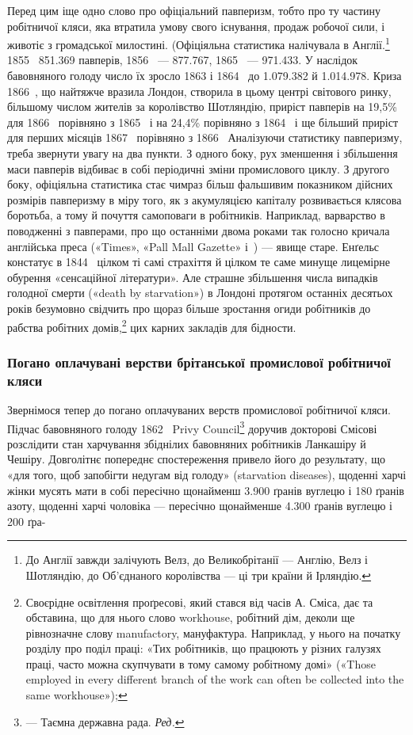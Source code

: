 Перед цим іще одно слово про офіціальний павперизм, тобто
про ту частину робітничої кляси, яка втратила умову свого існування,
продаж робочої сили, і животіє з громадської милостині.
(Офіціяльна статистика налічувала в Англії.\footnote{
До Англії завжди залічують Велз, до Великобрітанії — Англію,
Велз і Шотляндію, до Об’єднаного королівства — ці три країни й Ірляндію.
} 1855~ \num{851.369} павперів,
1856~ — \num{877.767}, 1865~ — \num{971.433}. У наслідок бавовняного
голоду число їх зросло 1863 і 1864~ до \num{1.079.382}
й \num{1.014.978}. Криза 1866~, що найтяжче вразила Лондон, створила
в цьому центрі світового ринку, більшому числом жителів
за королівство Шотляндію, приріст павперів на 19,5\% для
1866~ порівняно з 1865~ і на 24,4\% порівняно з 1864~ і ще
більший приріст для перших місяців 1867~ порівняно з
1866~ Аналізуючи статистику павперизму, треба звернути увагу
на два пункти. З одного боку, рух зменшення і збільшення маси
павперів відбиває в собі періодичні зміни промислового циклу.
З другого боку, офіціяльна статистика стає чимраз більш фальшивим
показником дійсних розмірів павперизму в міру того,
як з акумуляцією капіталу розвивається клясова боротьба, а
тому й почуття самоповаги в робітників. Наприклад, варварство
в поводженні з павперами, про що останніми двома роками так
голосно кричала англійська преса («Times», «Pall Mall Gazette»
і~) — явище старе. Енґельс констатує в 1844~ цілком
ті самі страхіття й цілком те саме минуще лицемірне обурення
«сенсаційної літератури». Але страшне збільшення числа випадків
голодної смерти («death by starvation») в Лондоні протягом
останніх десятьох років безумовно свідчить про щораз більше зростання
огиди робітників до рабства робітних домів,\footnote{
Своєрідне освітлення проґресові, який стався від часів А. Сміса,
дає та обставина, що для нього слово workhouse, робітний дім, деколи ще
рівнозначне слову manufactory, мануфактура. Наприклад, у нього на
початку розділу про поділ праці: «Тих робітників, що працюють у різних
галузях праці, часто можна скупчувати в тому самому робітному домі»
(«Those employed in every different branch of the work can often be collected
into the same workhouse»);
} цих карних
закладів для бідности.

\subsubsection{Погано оплачувані верстви брітанської промислової робітничої
кляси}

Звернімося тепер до погано оплачуваних верств промислової
робітничої кляси. Підчас бавовняного голоду 1862~ Privy
Council\footnote*{
— Таємна державна рада. \emph{Ред.}
} доручив докторові Смісові розслідити стан харчування
збіднілих бавовняних робітників Ланкашіру й Чешіру. Довголітнє
попереднє спостереження привело його до результату, що
«для того, щоб запобігти недугам від голоду» (starvation diseases),
щоденні харчі жінки мусять мати в собі пересічно щонайменш
\num{3.900} ґранів вуглецю і 180 ґранів азоту, щоденні харчі
чоловіка — пересічно щонайменше \num{4.300} ґранів вуглецю і 200 ґра-
\parbreak{}  %
